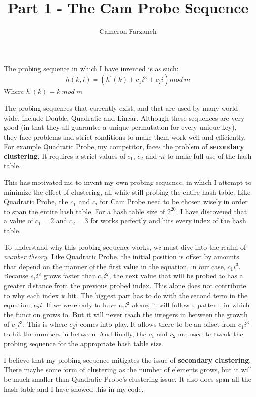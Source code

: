 \documentclass{article}
\author{Cameron Farzaneh}
\title{Part 1 - The Cam Probe Sequence\texttrademark {\small{\textregistered \copyright}}}
\begin{document}
	\maketitle
\noindent The probing sequence in which I have invented is as such:
$$h(k, i) =(h^\prime(k) + c_1i^3 + c_2i)mod\:m$$ 
Where $h^\prime(k) = k\:mod\:m$ \newline

The probing sequences that currently exist, and that are used by many world wide, include Double, Quadratic and Linear. Although these sequences are very good (in that they all guarantee a unique permutation for every unique key), they face problems and strict conditions to make them work well and efficiently. For example Quadratic Probe, my competitor, faces the problem of \textbf{secondary clustering}. It requires a strict values of $c_1$, $c_2$ and $m$ to make full use of the hash table. 

This has motivated me to invent my own probing sequence, in which I attempt to minimize the effect of clustering, all while still probing the entire hash table. Like Quadratic Probe, the $c_1$ and $c_2$ for Cam Probe{\small{\texttrademark}} need to be chosen wisely in order to span the entire hash table. For a hash table size of $2^{20}$, I have discovered that a value of $c_1 = 2$ and $c_2 = 3$ for works perfectly and hits every index of the hash table.

To understand why this probing sequence works, we must dive into the realm of \textit{number theory}. Like Quadratic Probe, the initial position is offset by amounts that depend on the manner of the first value in the equation, in our case, $c_1i^3$. Because $c_1i^3$ grows faster than $c_1i^2$, the next value that will be probed to has a greater distance from the previous probed index. This alone does not contribute to why each index is hit. The biggest part has to do with the second term in the equation, $c_2i$. If we were only to have $c_1i^3$ alone, it will follow a pattern, in which the function grows to. But it will never reach the integers in between the growth of $c_1i^3$. This is where $c_2i$ comes into play. It allows there to be an offset from $c_1i^3$ to hit the numbers in between. And finally, the $c_1$ and $c_2$ are used to tweak the probing sequence for the appropriate hash table size.

I believe that my probing sequence mitigates the issue of \textbf{secondary clustering}. There maybe some form of clustering as the number of elements grows, but it will be much smaller than Quadratic Probe's clustering issue. It also does span all the hash table and I have showed this in my code.
\end{document}
